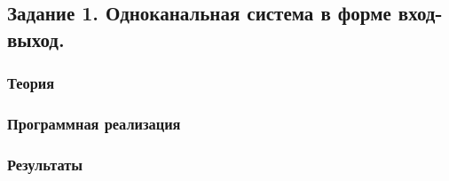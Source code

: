 \subsection{Задание 1. Одноканальная система в форме вход-выход.}
\subsubsection{Теория}
\subsubsection{Программная реализация}
\subsubsection{Результаты}